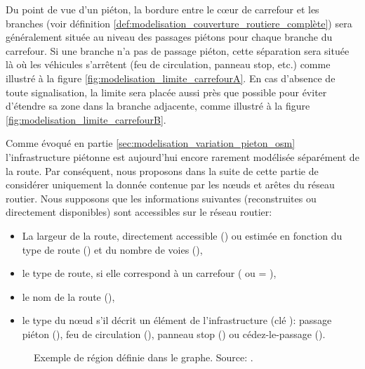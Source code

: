 Du point de vue d'un piéton, la bordure entre le cœur de carrefour et les branches (voir définition \ref{def:modelisation_couverture_routiere_complète}) sera généralement située au niveau des passages piétons pour chaque branche du carrefour. Si une branche n'a pas de passage piéton, cette séparation sera située là où les véhicules s'arrêtent (feu de circulation, panneau stop, etc.) comme illustré à la figure \ref{fig:modelisation_limite_carrefourA}. En cas d'absence de toute signalisation, la limite sera placée aussi près que possible pour éviter d'étendre sa zone dans la branche adjacente, comme illustré à la figure \ref{fig:modelisation_limite_carrefourB}.

\newpar{}

Comme évoqué en partie \ref{sec:modelisation_variation_pieton_osm} l'infrastructure piétonne est aujourd'hui encore rarement modélisée séparément de la route. Par conséquent, nous proposons dans la suite de cette partie de considérer uniquement la donnée contenue par les nœuds et arêtes du réseau routier. Nous supposons que les informations suivantes (reconstruites ou directement disponibles) sont accessibles sur le réseau routier:

\begin{itemize}
    \item La largeur de la route, directement accessible () ou estimée en fonction du type de route () et du nombre de voies (),
    \item le type de route, si elle correspond à un carrefour ( ou  = ),
    \item le nom de la route (),
    \item le type du nœud s'il décrit un élément de l'infrastructure (clé ): passage piéton (), feu de circulation (), panneau stop () ou cédez-le-passage ().
\end{itemize}

\newpar{}

\begin{figure}
    \centering
    \caption{Exemple de région définie dans le graphe. Source: \cite{Favreau2022}.}
    \label{fig:modelisation_region_segmentation}
\end{figure}

